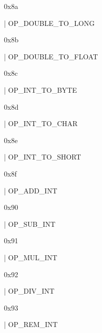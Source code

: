 \documentclass[11pt]{article}
\begin{document}
\begin{ocamldoccomment}
0x8a
\end{ocamldoccomment}
\begin{ocamldoccode}
  | OP_DOUBLE_TO_LONG
\end{ocamldoccode}
\begin{ocamldoccomment}
0x8b
\end{ocamldoccomment}
\begin{ocamldoccode}
  | OP_DOUBLE_TO_FLOAT
\end{ocamldoccode}
\begin{ocamldoccomment}
0x8c
\end{ocamldoccomment}
\begin{ocamldoccode}
  | OP_INT_TO_BYTE
\end{ocamldoccode}
\begin{ocamldoccomment}
0x8d
\end{ocamldoccomment}
\begin{ocamldoccode}
  | OP_INT_TO_CHAR
\end{ocamldoccode}
\begin{ocamldoccomment}
0x8e
\end{ocamldoccomment}
\begin{ocamldoccode}
  | OP_INT_TO_SHORT
\end{ocamldoccode}
\begin{ocamldoccomment}
0x8f
\end{ocamldoccomment}
\begin{ocamldoccode}
  | OP_ADD_INT
\end{ocamldoccode}
\begin{ocamldoccomment}
0x90
\end{ocamldoccomment}
\begin{ocamldoccode}
  | OP_SUB_INT
\end{ocamldoccode}
\begin{ocamldoccomment}
0x91
\end{ocamldoccomment}
\begin{ocamldoccode}
  | OP_MUL_INT
\end{ocamldoccode}
\begin{ocamldoccomment}
0x92
\end{ocamldoccomment}
\begin{ocamldoccode}
  | OP_DIV_INT
\end{ocamldoccode}
\begin{ocamldoccomment}
0x93
\end{ocamldoccomment}
\begin{ocamldoccode}
  | OP_REM_INT
\end{ocamldoccode}
\end{document}
